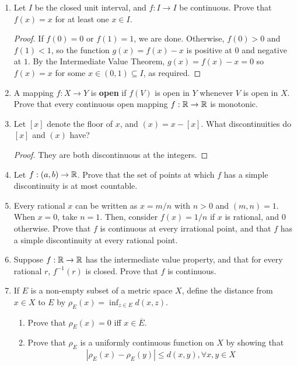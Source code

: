 \begin{enumerate}
\item %
Let $I$ be the closed unit interval, and $f: I \to I$ be continuous. Prove that $f(x) = x$ for at least one $x \in I$.
\begin{proof}
    If $f(0) = 0$ or $f(1) = 1$, we are done. Otherwise, $f(0) > 0$ and $f(1) < 1$, so the function $g(x) = f(x) - x$ is positive at $0$ and negative at $1$. By the Intermediate Value Theorem, $g(x) = f(x) - x = 0$ so $f(x) = x$ for some $x \in (0, 1) \subseteq I$, as required.
\end{proof}

\item %
A mapping $f: X \to Y$ is \textbf{open} if $f(V)$ is open in $Y$ whenever $V$ is open in $X$. Prove that every continuous open mapping $f: \mathbb{R} \rightarrow \mathbb{R}$ is monotonic.

\item %
Let $[x]$ denote the floor of $x$, and $(x) = x - [x]$. What discontinuities do $[x]$ and $(x)$ have?
\begin{proof}
They are both discontinuous at the integers.
\end{proof}

\item %
Let $f: (a, b) \rightarrow \mathbb{R}$. Prove that the set of points at which $f$ has a simple discontinuity is at most countable.

\item %
Every rational $x$ can be written as $x = m/n$ with $n > 0$ and $(m, n) = 1$. When $x = 0$, take $n = 1$. Then, consider $f(x) = 1/n$ if $x$ is rational, and 0 otherwise. Prove that $f$ is continuous at every irrational point, and that $f$ has a simple discontinuity at every rational point.

\item %
Suppose $f: \mathbb{R} \rightarrow \mathbb{R}$ has the intermediate value property, and that for every rational $r$, $f^{-1}(r)$ is closed. Prove that $f$ is continuous.

\item %
If $E$ is a non-empty subset of a metric space $X$, define the distance from $x \in X$ to $E$ by $\rho_E(x) = \inf_{z \in E} d(x, z)$.
\begin{enumerate}
\item Prove that $\rho_E(x) = 0$ iff $x \in \overline{E}$.
\item Prove that $\rho_E$ is a uniformly continuous function on $X$ by showing that
\[
    |\rho_E(x) - \rho_E(y)| \le d(x, y), \forall x, y \in X
\]
\end{enumerate}


\end{enumerate}
